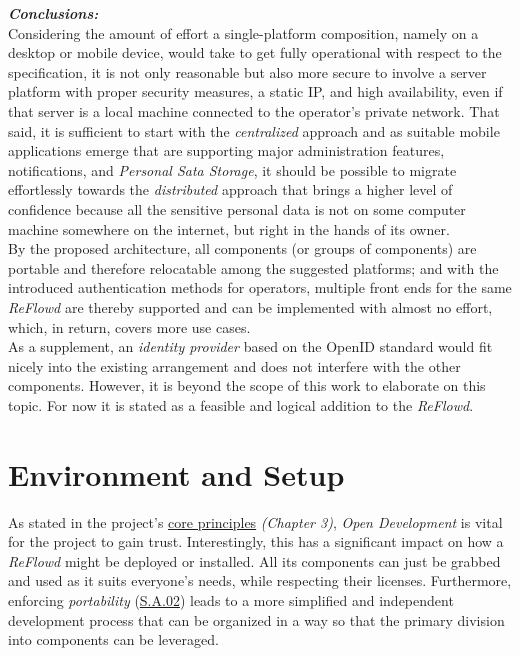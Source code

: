 \documentclass[12pt,english,a4paper,titlepage,cleardoublepage=empty,dottedtoc]{report}
\begin{document}
\emph{\textbf{Conclusions:}} ~\\
Considering the amount of effort a single-platform composition, namely
on a desktop or mobile device, would take to get fully operational with
respect to the specification, it is not only reasonable but also more
secure to involve a server platform with proper security measures, a
static IP, and high availability, even if that server is a local machine
connected to the operator's private network. That said, it is sufficient
to start with the \emph{centralized} approach and as suitable mobile
applications emerge that are supporting major administration features,
notifications, and \emph{Personal Sata Storage}, it should be possible
to migrate effortlessly towards the \emph{distributed} approach that
brings a higher level of confidence because all the sensitive personal
data is not on some computer machine somewhere on the internet, but
right in the hands of its owner.\\
By the proposed architecture, all components (or groups of components)
are portable and therefore relocatable among the suggested platforms;
and with the introduced authentication methods for operators, multiple
front ends for the same \emph{ReFlowd} are thereby supported and can be
implemented with almost no effort, which, in return, covers more use
cases.\\
As a supplement, an \emph{identity provider} based on the OpenID
standard would fit nicely into the existing arrangement and does not
interfere with the other components. However, it is beyond the scope of
this work to elaborate on this topic. For now it is stated as a feasible
and logical addition to the \emph{ReFlowd}.

\section{Environment and Setup}\label{environment-and-setup}

As stated in the project's \protect\hyperlink{core-principles}{core
principles} \emph{(Chapter 3)}, \emph{Open Development} is vital for the
project to gain trust. Interestingly, this has a significant impact on
how a \emph{ReFlowd} might be deployed or installed. All its components
can just be grabbed and used as it suits everyone's needs, while
respecting their licenses. Furthermore, enforcing \emph{portability}
(\protect\hyperlink{sa02}{S.A.02}) leads to a more simplified and
independent development process that can be organized in a way so that
the primary division into components can be leveraged.
\end{document}
